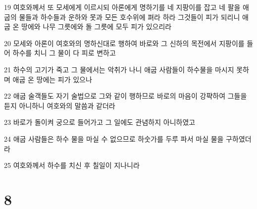 \par 19 여호와께서 또 모세에게 이르시되 아론에게 명하기를 네 지팡이를 잡고 네 팔을 애굽의 물들과 하수들과 운하와 못과 모든 호수위에 펴라 하라 그것들이 피가 되리니 애굽 온 땅에와 나무 그릇에와 돌 그릇에 모두 피가 있으리라
\par 20 모세와 아론이 여호와의 명하신대로 행하여 바로와 그 신하의 목전에서 지팡이를 들어 하수를 치니 그 물이 다 피로 변하고
\par 21 하수의 고기가 죽고 그 물에서는 악취가 나니 애굽 사람들이 하수물을 마시지 못하며 애굽 온 땅에는 피가 있으나
\par 22 애굽 술객들도 자기 술법으로 그와 같이 행하므로 바로의 마음이 강퍅하여 그들을 듣지 아니하니 여호와의 말씀과 같더라
\par 23 바로가 돌이켜 궁으로 들어가고 그 일에도 관념하지 아니하였고
\par 24 애굽 사람들은 하수 물을 마실 수 없으므로 하숫가를 두루 파서 마실 물을 구하였더라
\par 25 여호와께서 하수를 치신 후 칠일이 지나니라

\chapter{8}

